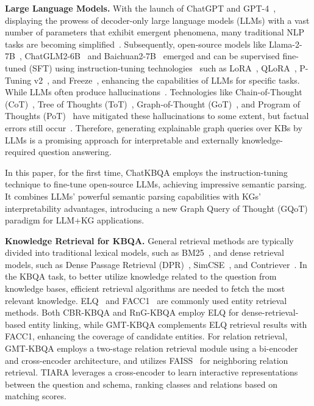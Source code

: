\documentclass{article} \usepackage{iclr2024_conference,times}
\begin{document}
\textbf{Large Language Models.} With the launch of ChatGPT and GPT-4~\citep{GPT4}, displaying the prowess of decoder-only large language models (LLMs) with a vast number of parameters that exhibit emergent phenomena, many traditional NLP tasks are becoming simplified~\citep{LLMsurvey}. Subsequently, open-source models like Llama-2-7B~\citep{Llama2}, ChatGLM2-6B~\citep{GLM} and Baichuan2-7B~\citep{Baichuan2} emerged and can be supervised fine-tuned (SFT) using instruction-tuning technologies~\citep{instructiontuning} such as LoRA~\citep{LoRA}, QLoRA~\citep{QLoRA}, P-Tuning v2~\citep{P-Tuningv2}, and Freeze~\citep{Freeze}, enhancing the capabilities of LLMs for specific tasks. While LLMs often produce hallucinations~\citep{hallucinations}. Technologies like Chain-of-Thought (CoT)~\citep{CoT}, Tree of Thoughts (ToT)~\citep{ToT}, Graph-of-Thought (GoT)~\citep{GoT}, and Program of Thoughts (PoT)~\citep{PoT} have mitigated these hallucinations to some extent, but factual errors still occur~\citep{LLMKGsurvey}. Therefore, generating explainable graph queries over KBs by LLMs is a promising approach for interpretable and externally knowledge-required question answering. 

In this paper, for the first time, ChatKBQA employs the instruction-tuning technique to fine-tune open-source LLMs, achieving impressive semantic parsing. It combines LLMs' powerful semantic parsing capabilities with KGs' interpretability advantages, introducing a new Graph Query of Thought (GQoT) paradigm for LLM+KG applications.


\textbf{Knowledge Retrieval for KBQA.} General retrieval methods are typically divided into traditional lexical models, such as BM25~\citep{BM25}, and dense retrieval models, such as Dense Passage Retrieval (DPR)~\citep{DPR}, SimCSE~\citep{SimCSE}, and Contriever~\citep{Contriever}. In the KBQA task, to better utilize knowledge related to the question from knowledge bases, efficient retrieval algorithms are needed to fetch the most relevant knowledge. ELQ~\citep{ELQ} and FACC1~\citep{FACC1} are commonly used entity retrieval methods. Both CBR-KBQA and RnG-KBQA employ ELQ for dense-retrieval-based entity linking, while GMT-KBQA complements ELQ retrieval results with FACC1, enhancing the coverage of candidate entities. For relation retrieval, GMT-KBQA employs a two-stage relation retrieval module using a bi-encoder and cross-encoder architecture, and utilizes FAISS~\citep{FAISS} for neighboring relation retrieval. TIARA leverages a cross-encoder to learn interactive representations between the question and schema, ranking classes and relations based on matching scores.
\end{document}
